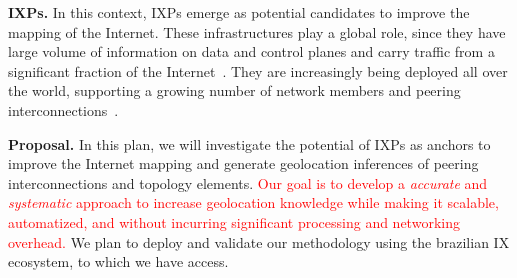 	\textbf{IXPs.} In this context, IXPs emerge as potential candidates to improve the mapping of the Internet. These infrastructures play a global role, since they have large volume of information on data and control planes and carry traffic from a significant fraction of the Internet~\cite{Chatzis:2013:BUL:2504730.2504746}. They are increasingly being deployed all over the world, supporting a growing number of network members and peering interconnections~\cite{Giotsas:2017:DPI:3098822.3098855}.
	


	\textbf{Proposal.} In this plan, we will investigate the potential of IXPs as anchors to improve the Internet mapping and generate geolocation inferences of peering interconnections and topology elements. \textcolor{red}{Our goal is to develop a \emph{accurate} and \emph{systematic} approach to increase geolocation knowledge while making it scalable, automatized, and without incurring significant processing and networking overhead.} We plan to deploy and validate our methodology using the brazilian IX ecosystem, to which we have access.


